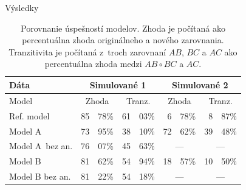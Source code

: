 \documentclass[xcolor=dvipsnames, compress, 12pt]{beamer}
\theoremstyle{definition}
\begin{document}



\begin{frame}{Výsledky}

\begin{table}[htp]
\centering
\begin{tabular}{|l|r@{,}lr@{,}l|r@{,}lr@{,}l|}
\hline
Dáta &  \multicolumn{4}{|c|}{Simulované 1}  & \multicolumn{4}{|c|}{Simulované 2}\\%
\hline
Model & \multicolumn{2}{|c}{Zhoda} & \multicolumn{2}{c}{Tranz.} & \multicolumn{2}{|c}{Zhoda} & \multicolumn{2}{c|}{Tranz.}\\%
\hline
Ref. model & 85 & 78\% & 61 & 03\% & 6 & 78\% & 8 & 87\%\\%
\hline
Model A~& 73 & 95\% & 38 & 10\% & 72 & 62\% & 39 & 48\%\\%
\hline
Model A~bez an. & 76 & 07\% & 45 & 63\% &  \multicolumn{2}{|c}{---} & \multicolumn{2}{c|}{---} \\%
\hline
Model B & 81 & 62\% & 54 & 94\% & 18 & 57\% & 10 & 50\%\\%
\hline
Model B  bez an.& 81 & 22\% & 54 & 18\% & \multicolumn{2}{|c}{---} & \multicolumn{2}{c|}{---}\\%
\hline

\end{tabular}
\vspace{0.5cm}
\caption{Porovnanie úspešností modelov. Zhoda je počítaná ako percentuálna zhoda originálneho a nového zarovnania. Tranzitivita je počítaná z~troch zarovnaní $AB$, $BC$ a $AC$ ako percentuálna zhoda medzi $AB \circ BC$ a $AC$.}
\label{tab:datatype-all}
\end{table}

\end{frame}
\end{document}
